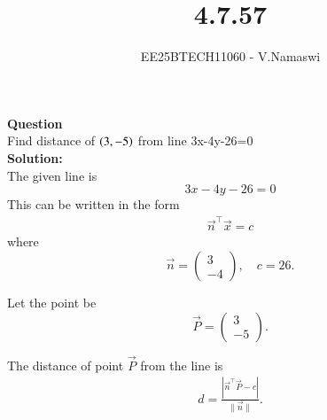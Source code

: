 \documentclass[journal]{IEEEtran}
\begin{document}

\vspace{3cm}

\title{4.7.57}
\author{EE25BTECH11060 - V.Namaswi}
{\let\newpage\relax\maketitle}

\renewcommand{\thefigure}{\theenumi}
\renewcommand{\thetable}{\theenumi}
\setlength{\intextsep}{10pt} %
\textbf{Question}\\  
Find distance of $\left(3,-5\right)$ from line 3x-4y-26=0\\
 \textbf{Solution:}\\
The given line is
\[
3x - 4y - 26 = 0
\]
This can be written in the form 
\begin{align}
\Vec{n}^\top \Vec{x}= c
\end{align}
where 
\[
\Vec{n}= \begin{pmatrix} 3 \\ -4 \end{pmatrix}, 
\quad c = 26.
\]

Let the point be 
\[
\Vec{P} = \begin{pmatrix} 3 \\ -5 \end{pmatrix}.
\]

The distance of point \(\Vec{P}\) from the line is
\begin{align}
d = \frac{|\Vec{n}^\top \Vec{P} - c|}{\|\Vec{n}\|}.
\end{align}
\end{document}
